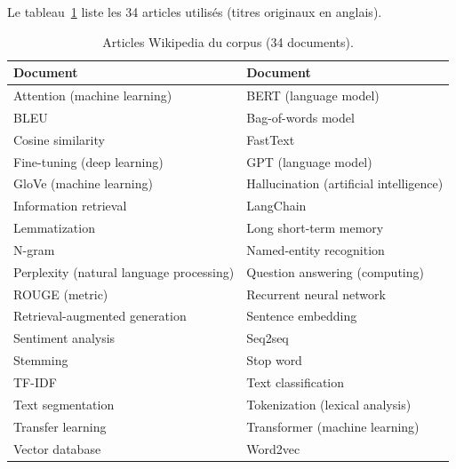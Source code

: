 Le tableau~\ref{tab:corpus} liste les 34 articles utilis\'es (titres originaux en anglais).

\begin{table}[H]
  \centering
  \caption{Articles Wikipedia du corpus (34 documents).}
  \label{tab:corpus}
  \small
  \begin{tabular}{@{}p{}p{}@{}}
    \toprule
    \textbf{Document} & \textbf{Document} \\
    \midrule
    Attention (machine learning) & BERT (language model) \\
    BLEU & Bag-of-words model \\
    Cosine similarity & FastText \\
    Fine-tuning (deep learning) & GPT (language model) \\
    GloVe (machine learning) & Hallucination (artificial intelligence) \\
    Information retrieval & LangChain \\
    Lemmatization & Long short-term memory \\
    N-gram & Named-entity recognition \\
    Perplexity (natural language processing) & Question answering (computing) \\
    ROUGE (metric) & Recurrent neural network \\
    Retrieval-augmented generation & Sentence embedding \\
    Sentiment analysis & Seq2seq \\
    Stemming & Stop word \\
    TF-IDF & Text classification \\
    Text segmentation & Tokenization (lexical analysis) \\
    Transfer learning & Transformer (machine learning) \\
    Vector database & Word2vec \\
    \bottomrule
  \end{tabular}
\end{table}
